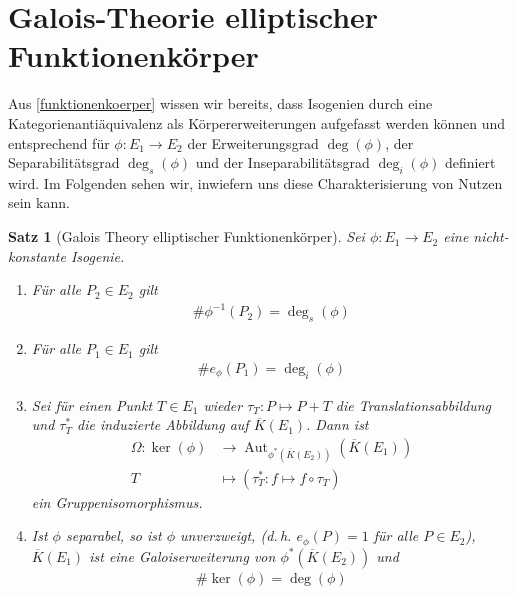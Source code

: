 \documentclass[english, german, parskip=half]{scrartcl}
\newtheorem{Satz}{Satz}[section]
\theoremstyle{definition}
\theoremstyle{remark}
\newcommand*{\algK}{\ensuremath{\overline K}} %
\newcommand*{\longto}{\longrightarrow}
\newcommand*{\degs}{\operatorname{\deg}_s} %
\newcommand*{\degi}{\operatorname{\deg}_i} %
\DeclareMathOperator{\Aut}{Aut} %
\begin{document}

\section{Galois-Theorie elliptischer Funktionenkörper}
Aus \autoref{funktionenkoerper} wissen wir bereits, dass Isogenien
durch eine Kategorienantiäquivalenz als Körpererweiterungen aufgefasst
werden können und entsprechend für $\phi\colon E_1\to E_2$ der
Erweiterungsgrad $\deg(\phi)$, der Separabilitätsgrad $\degs(\phi)$
und der Inseparabilitätsgrad $\degi(\phi)$ definiert wird.
Im Folgenden sehen wir, inwiefern uns diese Charakterisierung von
Nutzen sein kann.

\begin{Satz}[Galois Theory elliptischer Funktionenkörper]\label{galois}
  Sei $\phi\colon E_1\to E_2$ eine nicht-konstante Isogenie.
  \begin{enumerate}[label=\roman*)]
  \item Für alle $P_2\in E_2$ gilt
    \begin{gather*}
      \#\phi^{-1}(P_2) = \degs(\phi)
    \end{gather*}
  \item Für alle $P_1\in E_1$ gilt
    \begin{gather*}
      \#e_{\phi}(P_1) = \degi(\phi)
    \end{gather*}
  \item Sei für einen Punkt $T\in E_1$ wieder 
    $\tau_T\colon P\mapsto P+T$ die Translationsabbildung und 
    $\tau_T^*$ die induzierte Abbildung auf $\algK(E_1)$.
    Dann ist
    \begin{align*}
      \Omega\colon
      \ker(\phi) 
      &\longto \Aut_{\phi^*(\algK(E_2))}\left( \algK(E_1) \right) \\
      T 
      &\longmapsto \left( \tau_T^* \colon f\mapsto f\circ \tau_T \right)
    \end{align*}
    ein Gruppenisomorphismus.
  \item Ist $\phi$ separabel, 
    so ist $\phi$ unverzweigt,
    (d.\,h. $e_\phi(P)=1$ für alle $P\in E_2$),
    $\algK(E_1)$ ist eine Galoiserweiterung von $\phi^*(\algK(E_2))$
    und
    \begin{gather*}
      \#\ker(\phi) = \deg(\phi)
    \end{gather*}

  \end{enumerate}


\end{Satz}
\end{document}

